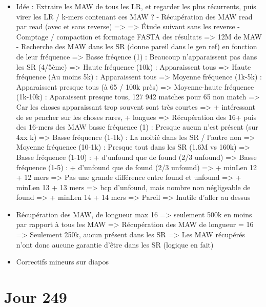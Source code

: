 \documentclass[12pt]{report}
\begin{document}
\begin{itemize}
	\item Idée : Extraire les MAW de tous les LR, et regarder les plus récurrents, puis virer les LR / k-mers
		  contenant ces MAW ?
		  - Récupération des MAW read par read (avec et sans reverse) => => Étude suivant sans les reverse
		  - Comptage / compaction et formatage FASTA des résultats => 12M de MAW
		  - Recherche des MAW dans les SR (donne pareil dans le gen ref) en fonction de leur fréquence
		  	=> Basse fréqence (1) : Beaucoup n'apparaissent pas dans les SR (4/5ème)
		  	=> Haute fréquence (10k) : Apparaissent tous
		  	=> Haute fréquence (Au moins 5k) : Apparaissent tous
		  	=> Moyenne fréquence (1k-5k) : Apparaissent presque tous (à 65 / 100k près)
		  	=> Moyenne-haute fréquence (1k-10k) : Aparaissent presque tous, 127 942 matches pour 65 non match
		  		=> Car les choses apparaissant trop souvent sont très courtes
		  		=> + intéressant de se pencher sur les choses rares, + longues
		  	=> Récupération des 16+ puis des 16-mers des MAW basse fréquence (1) : Presque aucun n'est présent (sur 4xx k)
		  	=> Basse fréquence (1-1k) : La moitié dans les SR / l'autre non
		  	=> Moyenne fréquence (10-1k) : Presque tout dans les SR (1.6M vs 160k)
		  	=> Basse fréquence (1-10) : + d'unfound que de found (2/3 unfound)
		  	=> Basse fréquence (1-5) : + d'unfound que de found (2/3 unfound)
		  		=> + minLen 12 + 12 mers => Pas une grande différence entre found et unfound
		  		=> + minLen 13 + 13 mers => bcp d'unfound, mais nombre non négligeable de found
		  		=> + minLen 14 + 14 mers => Pareil
		  		=> Inutile d'aller au dessus
		  		
	\item Récupération des MAW, de longueur max 16 => seulement 500k en moins par rapport à tous les MAW
		  => Récupération des MAW de longueur = 16 => Seulement 250k, aucun présent dans les SR
		  => Les MAW récupérés n'ont donc aucune garantie d'être dans les SR (logique en fait)
		  	
	\item Correctifs mineurs sur diapos
\end{itemize}

\section{Jour 249}
\end{document}
